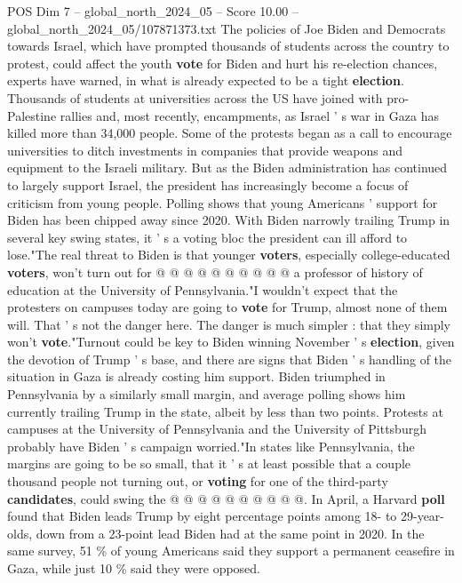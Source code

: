 \begin{textsample}{POS Dim 7 – global\_north\_2024\_05 – Score 10.00 – global\_north\_2024\_05/107871373.txt}  \label{ex:f7_pos_054}
The policies of Joe Biden and Democrats towards Israel, which have prompted thousands of students across the country to protest, could affect the youth \textbf{vote} for Biden and hurt his re-election chances, experts have warned, in what is already expected to be a tight \textbf{election}.
Thousands of students at universities across the US have joined with pro-Palestine rallies and, most recently, encampments, as Israel ' s war in Gaza has killed more than 34,000 people.
Some of the protests began as a call to encourage universities to ditch investments in companies that provide weapons and equipment to the Israeli military.
But as the Biden administration has continued to largely support Israel, the president has increasingly become a focus of criticism from young people.
Polling shows that young Americans ' support for Biden has been chipped away since 2020.
With Biden narrowly trailing Trump in several key swing states, it ' s a voting bloc the president can ill afford to lose."The real threat to Biden is that younger \textbf{voters}, especially college-educated \textbf{voters}, won't turn out for @ @ @ @ @ @ @ @ @ @ a professor of history of education at the University of Pennsylvania."I wouldn't expect that the protesters on campuses today are going to \textbf{vote} for Trump, almost none of them will.
That ' s not the danger here.
The danger is much simpler : that they simply won't \textbf{vote}."Turnout could be key to Biden winning November ' s \textbf{election}, given the devotion of Trump ' s base, and there are signs that Biden ' s handling of the situation in Gaza is already costing him support.
Biden triumphed in Pennsylvania by a similarly small margin, and average polling shows him currently trailing Trump in the state, albeit by less than two points.
Protests at campuses at the University of Pennsylvania and the University of Pittsburgh probably have Biden ' s campaign worried."In states like Pennsylvania, the margins are going to be so small, that it ' s at least possible that a couple thousand people not turning out, or \textbf{voting} for one of the third-party \textbf{candidates}, could swing the @ @ @ @ @ @ @ @ @ @.
In April, a Harvard \textbf{poll} found that Biden leads Trump by eight percentage points among 18- to 29-year-olds, down from a 23-point lead Biden had at the same point in 2020.
In the same survey, 51 \% of young Americans said they support a permanent ceasefire in Gaza, while just 10 \% said they were opposed.

\end{textsample}
